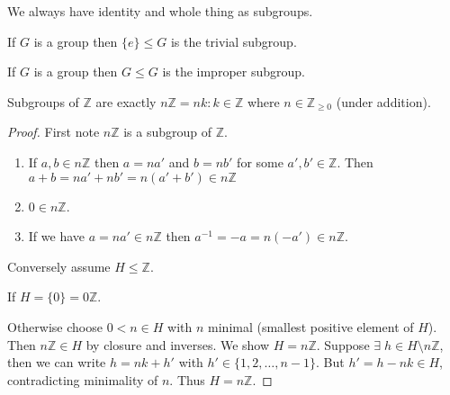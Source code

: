 We always have identity and whole thing as subgroups.

\begin{example}
If $G$ is a group then $\{ e \} \leq G$ is the trivial subgroup.
\end{example}

\begin{example}
If $G$ is a group then $G \leq G$ is the improper subgroup.
\end{example}

\begin{proposition}
\protect\hypertarget{prp:nZ}{}\label{prp:nZ}Subgroups of $\mathbb{Z}$ are exactly $n \mathbb{Z} = {nk : k \in \mathbb{Z}}$ where $n \in \mathbb{Z}_{\geq 0}$ (under addition).
\end{proposition}

\begin{proof}
First note $n \mathbb{Z}$ is a subgroup of $\mathbb{Z}$.

\begin{enumerate}
\def\labelenumi{\alph{enumi}.}
\item
  If $a, b \in n \mathbb{Z}$ then $a = na'$ and $b = nb'$ for some $a', b' \in \mathbb{Z}$.
  Then $a + b = na' + nb' = n (a' + b') \in n \mathbb{Z}$
\item
  $0 \in n \mathbb{Z}$.
\item
  If we have $a = na' \in n \mathbb{Z}$ then $a^{-1} = -a = n(-a') \in n \mathbb{Z}$.
\end{enumerate}

Conversely assume $H \leq \mathbb{Z}$.

If $H = \{ 0 \} = 0 \mathbb{Z}$.

Otherwise choose $0 < n \in H$ with $n$ minimal (smallest positive element of $H$).
Then $n \mathbb{Z} \in H$ by closure and inverses. We show $H = n \mathbb{Z}$. Suppose $\exists \; h \in H \setminus n \mathbb{Z}$, then we can write $h = nk + h'$ with $h' \in \{ 1, 2, \ldots, n -1 \}$. But $h' = h - nk \in H$, contradicting minimality of $n$. Thus $H = n \mathbb{Z}$.
\end{proof}

